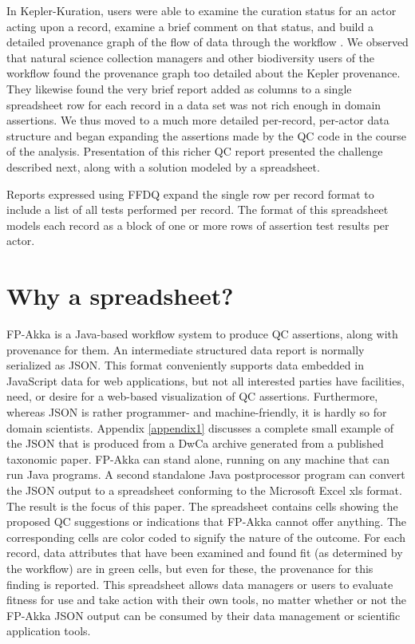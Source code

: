 \documentclass{article}
\begin{document}
In Kepler-Kuration, users were able to examine the curation status for an actor acting upon a record, examine a brief comment on that status, and build a detailed 
provenance graph of the flow of data through the workflow \citep{dou_kurator_2012}.   
We observed that natural science collection managers and other biodiversity users of the workflow found the provenance graph too detailed about the Kepler provenance.  They likewise found the very brief report added as columns to a single spreadsheet row for each record in a data set was  not rich enough in domain assertions.  We thus moved to a much more detailed per-record, per-actor data structure and began expanding the assertions made by the QC code in the course of the analysis.  Presentation of this richer QC report presented the challenge described next, along with a solution modeled by a spreadsheet.

Reports expressed using FFDQ expand the single row per record format to include a list of all tests performed per record. The format of this spreadsheet models each record as a block of one or more rows of assertion test results per actor. 

\section{Why a spreadsheet?}



FP-Akka is a Java-based workflow system to produce QC assertions, along with provenance for them. 
An intermediate structured data report is normally serialized as JSON.  This format conveniently supports data embedded in JavaScript data for web applications, but not all interested parties have facilities, need, or desire for a web-based visualization of  QC assertions. Furthermore, whereas JSON is rather programmer- and machine-friendly, it is hardly so for domain scientists.  
Appendix \ref{appendix1} discusses a complete small example of the JSON that is produced from a DwCa archive generated from a published taxonomic paper.
FP-Akka can stand alone, running on any machine that can run Java programs.  A second standalone Java postprocessor program can convert the JSON output to a spreadsheet conforming to the Microsoft Excel xls format. The result is the focus of this paper.  The spreadsheet contains cells showing the proposed QC suggestions or indications that FP-Akka cannot offer anything.  The corresponding cells are color coded to signify the nature of the outcome.  For each record, data attributes that have been examined and found fit (as determined by the workflow) are in green cells, but even for these, the provenance for this finding is reported. This spreadsheet allows data managers or users to evaluate fitness for use and take action with their own tools, no matter whether or not the FP-Akka JSON output can be consumed by their data management or scientific application tools.
\end{document}
